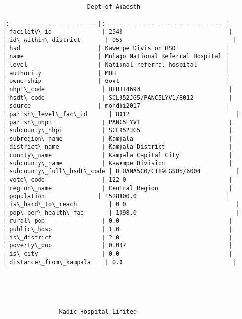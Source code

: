 \documentclass[11pt]{article}
\begin{document}
    \begin{Verbatim}[commandchars=\\\{\}]


                        Dept of Anaesth                         

|:-------------------------|:----------------------------------|
| facility\_id              | 2548                              |
| id\_within\_district       | 955                               |
| hsd                      | Kawempe Division HSD              |
| name                     | Mulago National Referral Hospital |
| level                    | National referral hospital        |
| authority                | MOH                               |
| ownership                | Govt                              |
| nhpi\_code                | HFBJT4693                         |
| hsdt\_code                | SCL952JG5/PANC5LYV1/8012          |
| source                   | mohdhi2017                        |
| parish\_level\_fac\_id      | 8012                              |
| parish\_nhpi              | PANC5LYV1                         |
| subcounty\_nhpi           | SCL952JG5                         |
| subregion\_name           | Kampala                           |
| district\_name            | Kampala District                  |
| county\_name              | Kampala Capital City              |
| subcounty\_name           | Kawempe Division                  |
| subcounty\_full\_hsdt\_code | DTUANA5C0/CT89FGSU5/6004          |
| vote\_code                | 122.0                             |
| region\_name              | Central Region                    |
| population               | 1528800.0                         |
| is\_hard\_to\_reach         | 0.0                               |
| pop\_per\_health\_fac       | 1098.0                            |
| rural\_pop                | 0.0                               |
| public\_hosp              | 1.0                               |
| is\_district              | 2.0                               |
| poverty\_pop              | 0.037                             |
| is\_city                  | 0.0                               |
| distance\_from\_kampala    | 0.0                               |





                Kadic Hospital Limited                 


\end{Verbatim}
\end{document}
